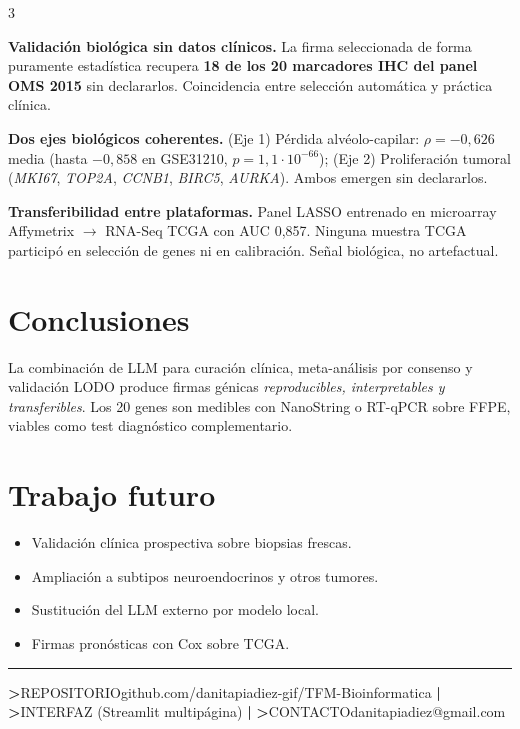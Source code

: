 \documentclass[10pt, a4paper, landscape]{article}
\newcommand{\gene}[1]{\textit{#1}}
\newcommand{\framework}{{\ttfamily\color{verdeOsc}data\textcolor{verdeTerm}{.}lung}}
\begin{document}
\begin{multicols}{3}
\begin{destacado}
\textbf{Validaci\'on biol\'ogica sin datos cl\'inicos.} La firma
seleccionada de forma puramente estad\'istica recupera \textbf{18 de
los 20 marcadores IHC del panel OMS 2015} sin declararlos.
Coincidencia entre selecci\'on autom\'atica y pr\'actica cl\'inica.
\end{destacado}

\begin{destacado}
\textbf{Dos ejes biol\'ogicos coherentes.} (Eje 1) P\'erdida
alv\'eolo-capilar: $\rho=-0{,}626$ media (hasta $-0{,}858$ en GSE31210,
$p=1{,}1\!\cdot\!10^{-66}$); (Eje 2) Proliferaci\'on tumoral
(\gene{MKI67}, \gene{TOP2A}, \gene{CCNB1}, \gene{BIRC5}, \gene{AURKA}).
Ambos emergen sin declararlos.
\end{destacado}

\begin{destacado}
\textbf{Transferibilidad entre plataformas.} Panel LASSO entrenado en
microarray Affymetrix $\to$ RNA-Seq TCGA con AUC 0,857. Ninguna
muestra TCGA particip\'o en selecci\'on de genes ni en calibraci\'on.
Se\~nal biol\'ogica, no artefactual.
\end{destacado}

\section{Conclusiones}
\footnotesize
La combinaci\'on de LLM para curaci\'on cl\'inica, meta-an\'alisis por
consenso y validaci\'on LODO produce firmas g\'enicas
\emph{reproducibles, interpretables y transferibles}. Los 20 genes son
medibles con NanoString o RT-qPCR sobre FFPE, viables como test
diagn\'ostico complementario.

\section{Trabajo futuro}
\footnotesize
\begin{itemize}[leftmargin=1em, itemsep=0pt, topsep=1pt]
  \item Validaci\'on cl\'inica prospectiva sobre biopsias frescas.
  \item Ampliaci\'on a subtipos neuroendocrinos y otros tumores.
  \item Sustituci\'on del LLM externo por modelo local.
  \item Firmas pron\'osticas con Cox sobre TCGA.
\end{itemize}

\end{multicols}

\vspace{-0.4em}
\textcolor{linea}{\rule{\textwidth}{0.5pt}}
\vspace{-0.1em}

\begin{center}
{\ttfamily\scriptsize\color{mute}
\textbf{>}\;REPOSITORIO\quad\color{tinta2}github.com/danitapiadiez-gif/TFM-Bioinformatica
\quad\color{mute}\textbf{|}\quad
\textbf{>}\;INTERFAZ\quad\color{tinta2}\framework{} (Streamlit multip\'agina)
\quad\color{mute}\textbf{|}\quad
\textbf{>}\;CONTACTO\quad\color{tinta2}danitapiadiez@gmail.com}
\end{center}
\end{document}
